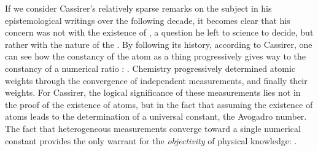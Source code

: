 \documentclass[submitted,12pt]{article}
\begin{document}

If we consider Cassirer’s relatively sparse remarks on the subject in his epistemological writings over the following decade, it becomes clear that his concern was not with the existence of , a question he left to science to decide, but rather with the nature of the  . By following its history, according to Cassirer, one can see how the constancy of the atom as a thing  progressively gives way to the constancy of a numerical ratio :  . Chemistry progressively determined  atomic weights through the convergence of independent measurements, and finally their  weights. For Cassirer, the logical significance of these measurements lies not in the proof of the existence of atoms, but in the fact that assuming the existence of atoms leads to the determination of a universal constant, the Avogadro number. The fact that heterogeneous measurements converge toward a single numerical constant provides the only warrant for the \emph{objectivity} of physical knowledge:   .
\end{document}
